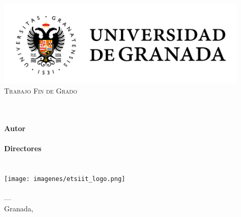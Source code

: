 \begin{titlepage}
 
 
\newlength{\centeroffset}
\setlength{\centeroffset}{-0.5\oddsidemargin}
\addtolength{\centeroffset}{0.5\evensidemargin}
\thispagestyle{empty}

\noindent\hspace*{\centeroffset}\begin{minipage}{\textwidth}

\centering
\includegraphics[width=0.9\textwidth]{imagenes/logo_ugr.jpg}\\[1.4cm]

\textsc{ \Large Trabajo Fin de Grado \\[0.2cm]}
\textsc{ \myDegree }\\[1.5cm] %
% 
{\Large\bfseries \myTitle\\
}
\end{minipage}

\vspace{2.5cm} %
\noindent\hspace*{\centeroffset}\begin{minipage}{\textwidth}
\centering

\textbf{Autor}\\ {\myName}\\[2.5ex]
\textbf{Directores}\\
{\myProf\\
\myOtherProf}\\[2cm]
\texttt{[image: imagenes/etsiit\_logo.png]}\\[0.1cm]
\textsc{\myFaculty}\\
\textsc{---}\\
Granada, \myTime
\end{minipage}
\end{titlepage}


